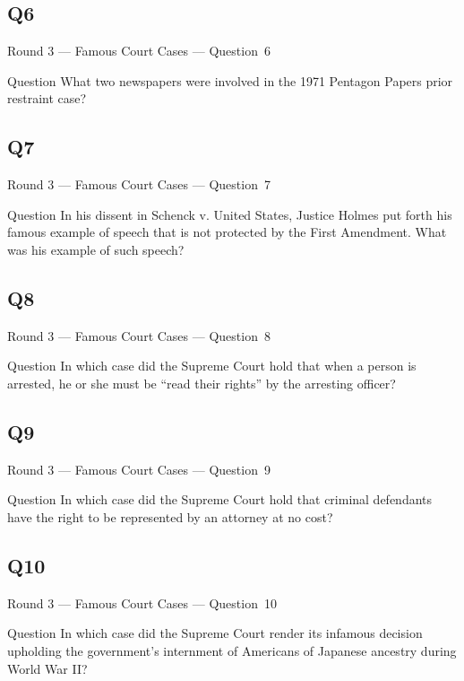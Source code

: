 \documentclass[11pt]{beamer}
\begin{document}
\subsection*{Q6}
\begin{frame}[t]{Round 3 --- Famous Court Cases --- \mbox{Question 6}}
\vspace{-0.5em}
\begin{block}{Question}
What two newspapers were involved in the 1971 Pentagon Papers prior restraint case?
\end{block}
\end{frame}
\subsection*{Q7}
\begin{frame}[t]{Round 3 --- Famous Court Cases --- \mbox{Question 7}}
\vspace{-0.5em}
\begin{block}{Question}
In his dissent in  Schenck v. United States, Justice Holmes put forth his famous example of speech that is not protected by the First Amendment.  What was his example of such speech?
\end{block}
\end{frame}
\subsection*{Q8}
\begin{frame}[t]{Round 3 --- Famous Court Cases --- \mbox{Question 8}}
\vspace{-0.5em}
\begin{block}{Question}
In which case did the Supreme Court hold that when a person is arrested, he or she must be ``read their rights'' by the arresting officer?
\end{block}
\end{frame}
\subsection*{Q9}
\begin{frame}[t]{Round 3 --- Famous Court Cases --- \mbox{Question 9}}
\vspace{-0.5em}
\begin{block}{Question}
In which case did the Supreme Court hold that criminal defendants have the right to be represented by an  attorney at no cost? 
\end{block}
\end{frame}
\subsection*{Q10}
\begin{frame}[t]{Round 3 --- Famous Court Cases --- \mbox{Question 10}}
\vspace{-0.5em}
\begin{block}{Question}
In which case did the Supreme Court render its infamous decision upholding the government's internment of Americans of Japanese ancestry during World War II\@?
\end{block}
\end{frame}
\end{document}
